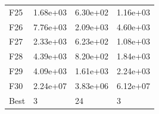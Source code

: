\begin{table}[H]
\begin{minipage}{.5\linewidth}
\begin{tabular}{llll}
            F25  &  1.68e+03 &  6.30e+02 &  1.16e+03 \\
            F26  &  7.76e+03 &  2.09e+03 &  4.60e+03 \\
            F27  &  2.33e+03 &  6.23e+02 &  1.08e+03 \\
            F28  &  4.39e+03 &  8.20e+02 &  1.84e+03 \\
            F29  &  4.09e+03 &  1.61e+03 &  2.24e+03 \\
            F30  &  2.24e+07 &  3.83e+06 &  6.12e+07 \\
            Best &         3 &        24 &         3 \\
            \bottomrule
            \end{tabular}
            
    \end{minipage} 
\end{table}

